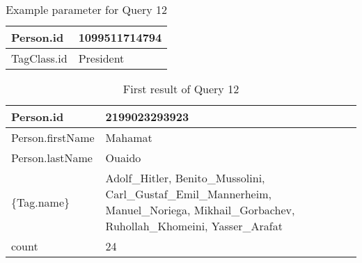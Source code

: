 \begin{table}[H]
    \begin{tabular}{|l|l|}
        \hline
        Person.id & 1099511714794 \\
        \hline
        TagClass.id & President \\
        \hline
    \end{tabular}
    \caption{Example parameter for Query 12}
\end{table}

\begin{table}[H]
    \begin{tabular}{|p{8cm}|p{8cm}|}
        \hline
        Person.id & 2199023293923 \\
        \hline
        Person.firstName & Mahamat \\
        \hline
        Person.lastName & Ouaido \\
        \hline
        \{Tag.name\} & Adolf\_Hitler, Benito\_Mussolini, Carl\_Gustaf\_Emil\_Mannerheim, Manuel\_Noriega, Mikhail\_Gorbachev, Ruhollah\_Khomeini, Yasser\_Arafat  \\
        \hline
        count & 24 \\
        \hline
    \end{tabular}
    \caption{First result of Query 12}
\end{table}

